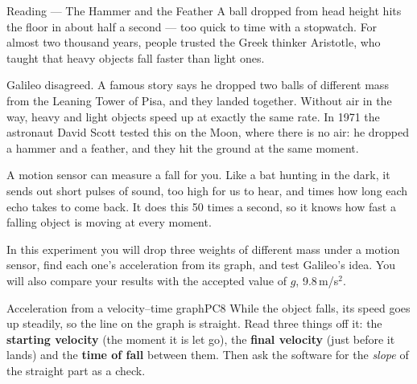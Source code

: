 
\begin{readingbox}{Reading --- The Hammer and the Feather}
A ball dropped from head height hits the floor in about half a second --- too quick to time with a stopwatch. For almost two thousand years, people trusted the Greek thinker Aristotle, who taught that heavy objects fall faster than light ones.

Galileo disagreed. A famous story says he dropped two balls of different mass from the Leaning Tower of Pisa, and they landed together. Without air in the way, heavy and light objects speed up at exactly the same rate. In 1971 the astronaut David Scott tested this on the Moon, where there is no air: he dropped a hammer and a feather, and they hit the ground at the same moment.

A motion sensor can measure a fall for you. Like a bat hunting in the dark, it sends out short pulses of sound, too high for us to hear, and times how long each echo takes to come back. It does this 50 times a second, so it knows how fast a falling object is moving at every moment.

In this experiment you will drop three weights of different mass under a motion sensor, find each one's acceleration from its graph, and test Galileo's idea. You will also compare your results with the accepted value of $g$, 9.8\,m/s$^2$.
\end{readingbox}

\rcreset
{}


\begin{technique}{Acceleration from a velocity--time graph}{PC8}
While the object falls, its speed goes up steadily, so the line on the graph is straight. Read three things off it: the \textbf{starting velocity} (the moment it is let go), the \textbf{final velocity} (just before it lands) and the \textbf{time of fall} between them. Then ask the software for the \emph{slope} of the straight part as a check.
\end{technique}

